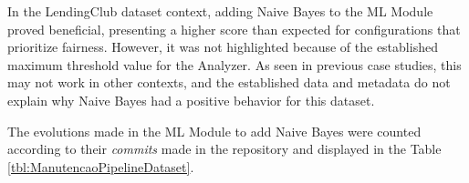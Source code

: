 \documentclass[sigconf]{acmart}
\begin{document}
\begin{table}[H]
\begin{center}
  \caption{Best configurations chosen by Autonomic Manager \\ 25\% Evaluation/75\% Fairness}
\label{tbl:ScoreMAPEKLendingclubCaso32575}
\end{center}
\end{table}

In the LendingClub dataset context, adding Naive Bayes to the ML Module proved beneficial, presenting a higher score than expected for configurations that prioritize fairness. However, it was not highlighted because of the established maximum threshold value for the Analyzer. As seen in previous case studies, this may not work in other contexts, and the established data and metadata do not explain why Naive Bayes had a positive behavior for this dataset.

The evolutions made in the ML Module to add Naive Bayes were counted according to their \textit{commits} made in the repository and displayed in the Table \ref{tbl:ManutencaoPipelineDataset}.
\end{document}
